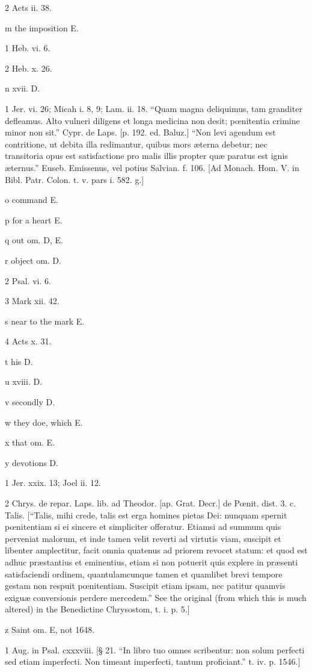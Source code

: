2
Acts ii. 38.

m
the imposition E.

1
Heb. vi. 6.

2
Heb. x. 26.

n
xvii. D.

1
Jer. vi. 26; Micah i. 8, 9; Lam. ii. 18. “Quam magna deliquimus, tam granditer defleamus. Alto vulneri diligens et longa medicina non desit; pœnitentia crimine minor non sit.” Cypr. de Laps. [p. 192. ed. Baluz.] “Non levi agendum est contritione, ut debita illa redimantur, quibus mors æterna debetur; nec transitoria opus est satisfactione pro malis illis propter quæ paratus est ignis æternus.” Euseb. Emissenus, vel potius Salvian. f. 106. [Ad Monach. Hom. V. in Bibl. Patr. Colon. t. v. pars i. 582. g.]

o
command E.

p
for a heart E.

q
out om. D, E.

r
object om. D.

2
Psal. vi. 6.

3
Mark xii. 42.

s
near to the mark E.

4
Acts x. 31.

t
his D.

u
xviii. D.

v
secondly D.

w
they doe, which E.

x
that om. E.

y
devotions D.

1
Jer. xxix. 13; Joel ii. 12.

2
Chrys. de repar. Laps. lib. ad Theodor. [ap. Grat. Decr.] de Pœnit. dist. 3. c. Talis. [“Talis, mihi crede, talis est erga homines pietas Dei: nunquam spernit pœnitentiam si ei sincere et simpliciter offeratur. Etiamsi ad summum quis perveniat malorum, et inde tamen velit reverti ad virtutis viam, suscipit et libenter amplectitur, facit omnia quatenus ad priorem revocet statum: et quod est adhuc præstantius et eminentius, etiam si non potuerit quis explere in præsenti satisfaciendi ordinem, quantulamcunque tamen et quamlibet brevi tempore gestam non respuit pœnitentiam. Suscipit etiam ipsam, nec patitur quamvis exiguæ conversionis perdere mercedem.” See the original (from which this is much altered) in the Benedictine Chrysostom, t. i. p. 5.]

z
Saint om. E, not 1648.

1
Aug. in Psal. cxxxviii. [§ 21. “In libro tuo omnes scribentur: non solum perfecti sed etiam imperfecti. Non timeant imperfecti, tantum proficiant.” t. iv. p. 1546.]

